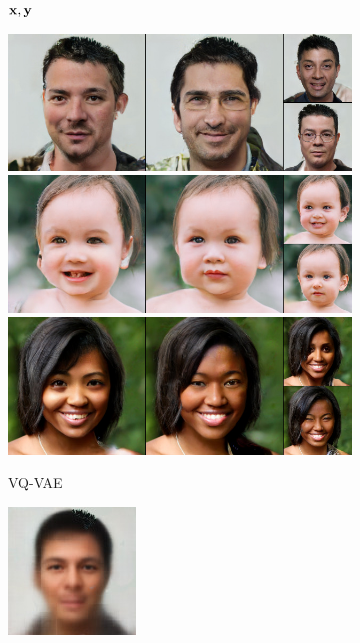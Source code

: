 \begin{figure}[t]
\begin{subfigure}[t]{0.22\textwidth}
      \caption*{${\mathbf{x}}, {\mathbf{y}}$}
    \end{subfigure}
    \begin{subfigure}[t]{0.25\textwidth}
      \centering
      \includegraphics[height=\ffhqimgheight]{figs/cigcvae/image-samples/ffhq256/freeform_vq_vae_0_samples.jpg}
      \includegraphics[height=\ffhqimgheight]{figs/cigcvae/image-samples/ffhq256/freeform_vq_vae_13_samples.jpg}
      \includegraphics[height=\ffhqimgheight]{figs/cigcvae/image-samples/ffhq256/freeform_vq_vae_32_samples.jpg}
      \caption{VQ-VAE}
    \end{subfigure}
    \begin{subfigure}[t]{0.25\textwidth}
      \centering
      \includegraphics[height=\ffhqimgheight]{figs/cigcvae/image-samples/ffhq256/freeform_ce_0_samples.jpg}\\

\end{subfigure}
\end{figure}
